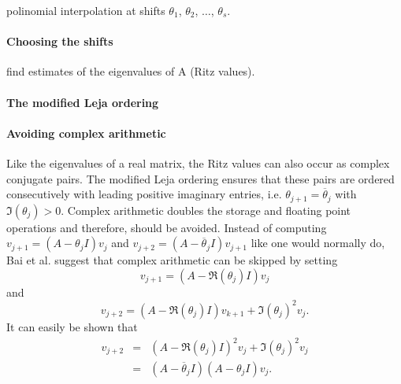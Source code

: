 \documentclass{scrartcl}
\begin{document}
polinomial interpolation at shifts $\theta_1$, $\theta_2$, $\ldots$, $\theta_s$.
\paragraph{Choosing the shifts}
find estimates of the eigenvalues of A (Ritz values).
\paragraph{The modified Leja ordering}

\paragraph{Avoiding complex arithmetic}
Like the eigenvalues of a real matrix, the Ritz values can also occur as complex conjugate pairs. The modified Leja ordering ensures that these pairs are ordered consecutively with leading positive imaginary entries, i.e. $\theta_{j + 1} = \overline{\theta}_j$ with $\Im(\theta_j) > 0$. Complex arithmetic doubles the storage and floating point operations and therefore, should be avoided. Instead of computing $v_{j + 1} = (A - \theta_j I)v_j$ and $v_{j + 2} = (A - \overline{\theta}_j I)v_{j + 1}$ like one would normally do, Bai et al. \cite{doi:10.1093/imanum/14.4.563} suggest that complex arithmetic can be skipped by setting
\begin{equation}
v_{j + 1} = (A - \Re(\theta_j) I )v_j
\end{equation}
and
\begin{equation}
v_{j + 2} = (A - \Re(\theta_j) I )v_{k + 1} + \Im(\theta_j)^2 v_j.
\end{equation}
It can easily be shown that 
\begin{eqnarray*}
v_{j + 2} &=& (A - \Re(\theta_j) I )^2v_{j} + \Im(\theta_j)^2 v_j \\
&=& (A - \overline{\theta}_j I )(A - \theta_j I )v_{j}.
\end{eqnarray*}
\end{document}
